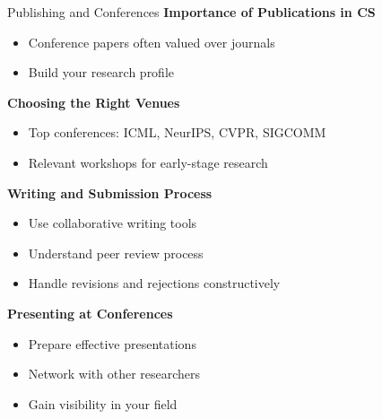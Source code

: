 \documentclass[aspectratio=169,10pt]{beamer}
\begin{document}
\begin{frame}{Publishing and Conferences}
    \textbf{Importance of Publications in CS}
    \begin{itemize}
        \item Conference papers often valued over journals
        \item Build your research profile
    \end{itemize}
    
    \textbf{Choosing the Right Venues}
    \begin{itemize}
        \item Top conferences: ICML, NeurIPS, CVPR, SIGCOMM
        \item Relevant workshops for early-stage research
    \end{itemize}
    
    \textbf{Writing and Submission Process}
    \begin{itemize}
        \item Use collaborative writing tools
        \item Understand peer review process
        \item Handle revisions and rejections constructively
    \end{itemize}
    
    \textbf{Presenting at Conferences}
    \begin{itemize}
        \item Prepare effective presentations
        \item Network with other researchers
        \item Gain visibility in your field
    \end{itemize}
\end{frame}
\end{document}
